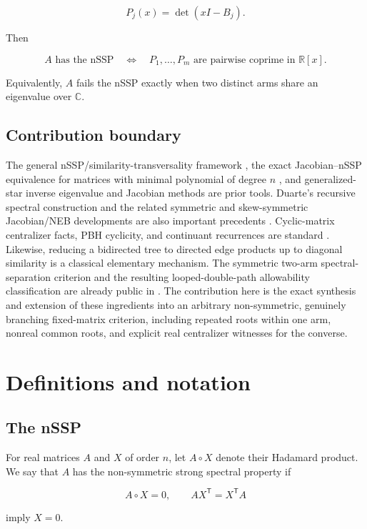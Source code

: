 \documentclass[11pt]{article}
\theoremstyle{remark}
\begin{document}
\[
P_j(x)=\det(xI-B_j).
\]

Then

\[
A\text{ has the nSSP}
\quad\Longleftrightarrow\quad
P_1,\ldots,P_m\text{ are pairwise coprime in }\mathbb R[x].
\]

Equivalently, $A$ fails the nSSP exactly when two distinct arms share an eigenvalue over $\mathbb C$.

\subsection*{Contribution boundary}

The general nSSP/similarity-transversality framework \cite{ref1,ref3}, the exact Jacobian--nSSP equivalence for matrices with minimal polynomial of degree $n$ \cite[Theorem 5.1]{ref2}, and generalized-star inverse eigenvalue and Jacobian methods \cite{ref4,ref5} are prior tools. Duarte's recursive spectral construction and the related symmetric and skew-symmetric Jacobian/NEB developments are also important precedents \cite{ref12,ref13,ref14}. Cyclic-matrix centralizer facts, PBH cyclicity, and continuant recurrences are standard \cite{ref9,ref10}. Likewise, reducing a bidirected tree to directed edge products up to diagonal similarity is a classical elementary mechanism. The symmetric two-arm spectral-separation criterion and the resulting looped-double-path allowability classification are already public in \cite{ref11}. The contribution here is the exact synthesis and extension of these ingredients into an arbitrary non-symmetric, genuinely branching fixed-matrix criterion, including repeated roots within one arm, nonreal common roots, and explicit real centralizer witnesses for the converse.

\section{Definitions and notation}

\subsection{The nSSP}

For real matrices $A$ and $X$ of order $n$, let $A\circ X$ denote their Hadamard product. We say that $A$ has the non-symmetric strong spectral property if

\[
A\circ X=0,
\qquad
AX^{\mathsf T}=X^{\mathsf T}A
\]

imply $X=0$.
\end{document}
